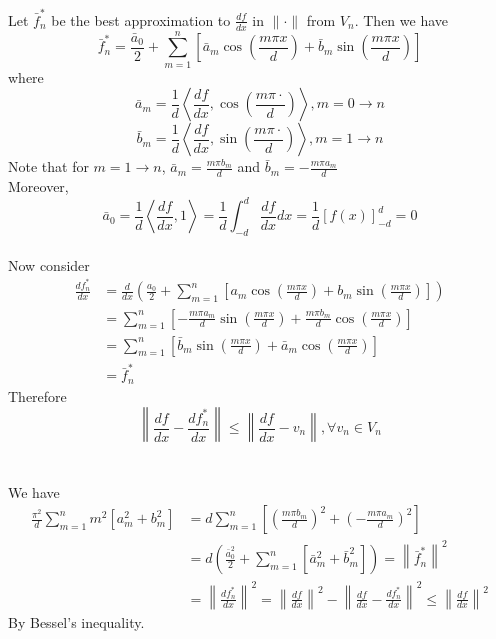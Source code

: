 \documentclass[12pt]{article}
\begin{document}
Let $\bar{f}_{n}^{*}$ be the best approximation to $\frac{df}{dx}$ in $\|\cdot\|$ from $V_n$.
Then we have
$$
\bar{f}_{n}^{*} = 
\frac{\bar{a}_0}{2} + 
\sum_{m=1}^{n}
\left[
\bar{a}_m\cos\left(\frac{m\pi x}{d}\right) +  \bar{b}_m\sin\left(\frac{m\pi x}{d}\right)
\right]
$$
where
$$
\bar{a}_m = 
\frac{1}{d}
\left\langle
\frac{df}{dx},
\cos\left(\frac{m\pi\cdot}{d}\right)
\right\rangle
, m = 0 \rightarrow n
$$
$$
\bar{b}_m = 
\frac{1}{d}
\left\langle
\frac{df}{dx},
\sin\left(\frac{m\pi\cdot}{d}\right)
\right\rangle
, m = 1 \rightarrow n
$$
Note that for $m=1 \rightarrow n$, $\bar{a}_m = \frac{m\pi b_m}{d}$ and  $\bar{b}_m = -\frac{m\pi a_m}{d}$
\\
Moreover, 
$$
\bar{a}_0=
\frac{1}{d}\left\langle\frac{df}{dx},1\right\rangle =
\frac{1}{d}\int_{-d}^{d}\frac{df}{dx}dx=
\frac{1}{d}\left[f(x)\right]_{-d}^{d}=0
$$
\\
Now consider
\begin{align*}
\frac{df_{n}^{*}}{dx}
&=
\frac{d}{dx}\left(
\frac{a_0}{2} +
\sum_{m=1}^{n}
\left[
a_m\cos\left(\frac{m\pi x}{d}\right) +
b_m\sin\left(\frac{m\pi x}{d}\right)
\right]
\right)
\\&=
\sum_{m=1}^{n}
\left[
-\frac{m\pi a_m}{d}\sin\left(\frac{m\pi x}{d}\right) +
\frac{m\pi b_m}{d}\cos\left(\frac{m\pi x}{d}\right)
\right]
\\&=
\sum_{m=1}^{n}
\left[
\bar{b}_m\sin\left(\frac{m\pi x}{d}\right) +
\bar{a}_m\cos\left(\frac{m\pi x}{d}\right)
\right]
\\&=
\bar{f}_{n}^{*}
\end{align*}
Therefore
$$
\left\|
\frac{df}{dx} -
\frac{df_{n}^{*}}{dx}
\right\|\leq
\left\|
\frac{df}{dx} -
v_n
\right\|
,\forall v_n\in V_n
$$


\section{}

We have
\begin{align*}
\frac{\pi^{2}}{d}\sum_{m=1}^{n}
m^2\left[a_m^2 + b_m^2\right]
&=
d\sum_{m=1}^{n}
\left[
\left(\frac{m\pi b_m}{d}\right)^2 + 
\left(-\frac{m\pi a_m}{d}\right)^2
\right]
\\&=
d\left(
\frac{\bar{a}_{0}^2}{2} +
\sum_{m=1}^{n}
\left[
\bar{a}_{m}^{2} + \bar{b}_{m}^{2}
\right]
\right)
=
\left\|\bar{f}_{n}^{*}\right\|^2
\\&=
\left\|\frac{df_n^*}{dx}\right\|^2
=
\left\|\frac{df}{dx}\right\|^2 -
\left\|\frac{df}{dx} - \frac{df_n^*}{dx}\right\|^2
\leq
\left\|\frac{df}{dx}\right\|^2
\end{align*}
By Bessel's inequality.
\end{document}
